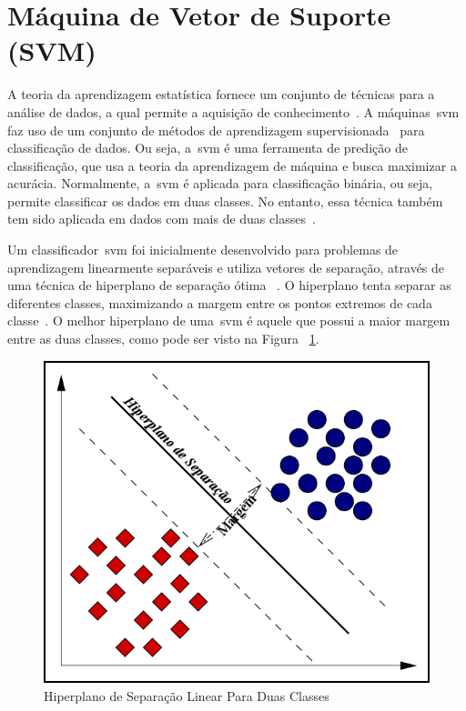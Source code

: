 \section{Máquina de Vetor de Suporte (SVM)}\label{sec:svm_linear}
A teoria da aprendizagem estatística fornece um conjunto de técnicas para a análise de dados, a qual permite a aquisição de conhecimento~\cite{vapnik95}. A máquinas~\ac{svm} faz uso de um conjunto de métodos de aprendizagem supervisionada~\cite{datamining2005} para classificação de dados. Ou seja, a~\ac{svm} é uma ferramenta de predição de classificação, que usa a teoria da aprendizagem de máquina e busca maximizar a acurácia. Normalmente, a~\ac{svm} é aplicada para classificação binária, ou seja, permite classificar os dados em duas classes. No entanto, essa técnica também tem sido aplicada em dados com mais de duas classes~\cite{multisvm2011}.

Um classificador~\ac{svm} foi inicialmente desenvolvido para problemas de aprendizagem linearmente separáveis e utiliza vetores de separação, através de uma técnica de hiperplano de separação ótima ~\cite{vapnik95}. O hiperplano tenta separar as diferentes classes, maximizando a margem entre os pontos extremos de cada classe~\cite{valt2010}. O melhor hiperplano de uma~\ac{svm} é aquele que possui a maior margem entre as duas classes, como pode ser visto na Figura ~\ref{fig:hiperplano}.  

\begin{figure}
 \centering
 \includegraphics[scale=0.4]{./img/svmhyperplane.png}
\caption{Hiperplano de Separação Linear Para Duas Classes}
 \label{fig:hiperplano}
\end{figure}


